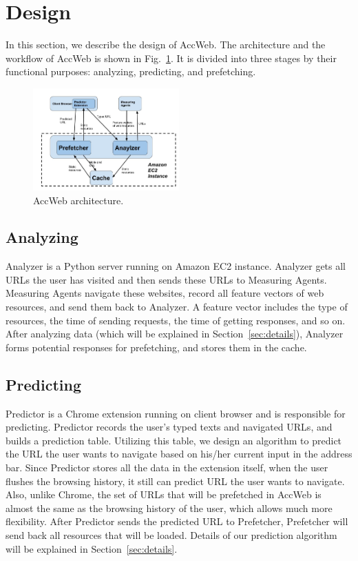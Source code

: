 \section{Design}
\label{sec:design}

In this section, we describe the design of AccWeb. The architecture and the workflow of AccWeb is shown in Fig.~\ref{fig:arch}. It is divided into three stages by their functional purposes: analyzing, predicting, and prefetching.

\begin{figure}[htbp] 
	\centering
	\includegraphics[width=0.5\textwidth]{ACCWeb-Arch-3.jpg}  
	\caption{AccWeb architecture.}
	\label{fig:arch}
\end{figure} 

\subsection{Analyzing}

Analyzer is a Python server running on Amazon EC2 instance. Analyzer gets all URLs the user has visited and then sends these URLs to Measuring Agents. Measuring Agents navigate these websites, record all feature vectors of web resources, and send them back to Analyzer. A feature vector includes the type of resources, the time of sending requests, the time of getting responses, and so on. After analyzing data (which will be explained in Section~\ref{sec:details}), Analyzer forms potential responses for prefetching, and stores them in the cache.

\subsection{Predicting}

Predictor is a Chrome extension running on client browser and is responsible for predicting. Predictor records the user's typed texts and navigated URLs, and builds a prediction table. Utilizing this table, we design an algorithm to predict the URL the user wants to navigate based on his/her current input in the address bar. Since Predictor stores all the data in the extension itself, when the user flushes the browsing history, it still can predict URL the user wants to navigate. Also, unlike Chrome, the set of URLs that will be prefetched in AccWeb is almost the same as the browsing history of the user, which allows much more flexibility. After Predictor sends the predicted URL to Prefetcher, Prefetcher will send back all resources that will be loaded. Details of our prediction algorithm will be explained in Section~\ref{sec:details}.

